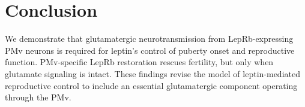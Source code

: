 \documentclass[11pt]{article}
\begin{document}
\section{Conclusion}

We demonstrate that glutamatergic neurotransmission from LepRb-expressing PMv neurons is required for leptin's control of puberty onset and reproductive function. PMv-specific LepRb restoration rescues fertility, but only when glutamate signaling is intact. These findings revise the model of leptin-mediated reproductive control to include an essential glutamatergic component operating through the PMv.



\end{document}
